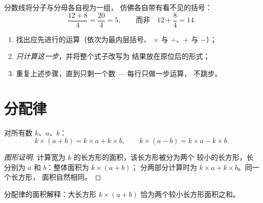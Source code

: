 \begin{remark}[分数线会隐藏括号]
分数线将分子与分母各自视为一组，
仿佛各自带有看不见的括号：
\[
\frac{12 + 8}{4} = \frac{20}{4} = 5,
\qquad\text{而非}\quad 12 + \frac{8}{4} = 14 .
\]
\end{remark}

\begin{method}[安全计算]\label{met:g7:priorities:safe}
\begin{enumerate}
  \item 找出应先进行的运算（依次为最内层括号、
        $\times$ 与 $\div$、$+$ 与 $-$）；
  \item \emph{只计算这一步}，并将整个式子改写为
        结果放在原位后的形式；
  \item 重复上述步骤，直到只剩一个数 --- 每行只做一步运算，
        不跳步。
\end{enumerate}
\end{method}

\section{分配律}

\begin{theorem}[分配律]\label{thm:g7:priorities:distributivity}
对所有数 $k$、$a$、$b$：
\[
k \times (a + b) = k \times a + k \times b,
\qquad
k \times (a - b) = k \times a - k \times b .
\]
\end{theorem}

\begin{proof}[图形证明]
计算宽为 $k$ 的长方形的面积，该长方形被分为两个
较小的长方形，长分别为 $a$ 和 $b$：整体面积为 $k \times (a+b)$；
分两部分计算时为 $k \times a + k \times b$。同一个长方形，
面积自然相同。
\end{proof}

\begin{omfigure}

{\small 分配律的面积解释：大长方形
$k \times (a + b)$ 恰为两个较小长方形面积之和。}
\end{omfigure}

